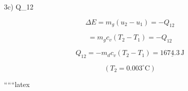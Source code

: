 3c) \quad Q_{12}

\[
\Delta E = m_g (u_2 - u_1) = -Q_{12}
\]

\[
= m_g c_v (T_2 - T_1) = -Q_{12}
\]

\[
Q_{12} = -m_d c_v (T_2 - T_1) = \underline{1674.3 \, \text{J}}
\]

\[
(T_2 = 0.003^\circ \text{C})
\]

``````latex